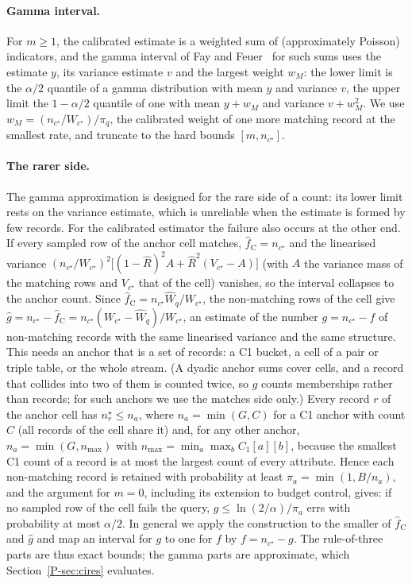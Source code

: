 \documentclass[sigconf,review,anonymous]{acmart}
\newcommand{\nstar}{n^{\star}}
\newcommand{\pref}[1]{\ref{P-#1}}
\begin{document}
\paragraph{Gamma interval.} For $m\ge1$, the calibrated estimate is a weighted sum of (approximately
Poisson) indicators, and the gamma interval of Fay and Feuer~\cite{fayfeuer} for such sums uses the
estimate $y$, its variance estimate $v$ and the largest weight $w_M$: the lower limit is the $\alpha/2$
quantile of a gamma distribution with mean $y$ and variance $v$, the upper limit the $1-\alpha/2$
quantile of one with mean $y+w_M$ and variance $v+w_M^2$. We use $w_M=(n_{c^\star}/W_{c^\star})/\pi_q$, the
calibrated weight of one more matching record at the smallest rate, and truncate to the hard bounds
$[m,n_{c^\star}]$.

\paragraph{The rarer side.} The gamma approximation is designed for the rare side of a count: its lower
limit rests on the variance estimate, which is unreliable when the estimate is formed by few records.
For the calibrated estimator the failure also occurs at the other end. If every sampled row of the anchor
cell matches, $\hat f_{\mathrm C}=n_{c^\star}$ and the linearised variance
$(n_{c^\star}/W_{c^\star})^2\bigl[(1-\hat R)^2A+\hat R^2(V_{c^\star}-A)\bigr]$ (with $A$ the variance mass of
the matching rows and $V_{c^\star}$ that of the cell) vanishes, so the interval collapses to the anchor
count. Since $\hat f_{\mathrm C}=n_{c^\star}\hat W_q/W_{c^\star}$, the non-matching rows of the cell give
$\hat g=n_{c^\star}-\hat f_{\mathrm C}=n_{c^\star}(W_{c^\star}-\hat W_q)/W_{c^\star}$, an estimate of the
number $g=n_{c^\star}-f$ of non-matching records with the same linearised variance and the same
structure. This needs an anchor that is a set of records: a C1 bucket, a cell of a pair or triple table,
or the whole stream. (A dyadic anchor sums cover cells, and a record that collides into two of them is
counted twice, so $g$ counts memberships rather than records; for such anchors we use the matches side
only.) Every record $r$ of the anchor cell has $\nstar_r\le n_a$, where $n_a=\min(G,C)$ for a C1 anchor
with count $C$ (all records of the cell share it) and, for any other anchor, $n_a=\min(G,n_{\max})$ with
$n_{\max}=\min_a\max_b C_1[a][b]$, because the smallest C1 count of a record is at most the largest count
of every attribute. Hence each non-matching record is retained with probability at least
$\pi_a=\min(1,B/n_a)$, and the argument for $m=0$, including its extension to budget control, gives: if no
sampled row of the cell fails the query, $g\le\ln(2/\alpha)/\pi_a$ errs with probability at most
$\alpha/2$. In general we apply the construction to the smaller of $\hat f_{\mathrm C}$ and $\hat g$ and
map an interval for $g$ to one for $f$ by $f=n_{c^\star}-g$. The rule-of-three parts are thus exact
bounds; the gamma parts are approximate, which Section~\pref{sec:cires} evaluates.
\end{document}
